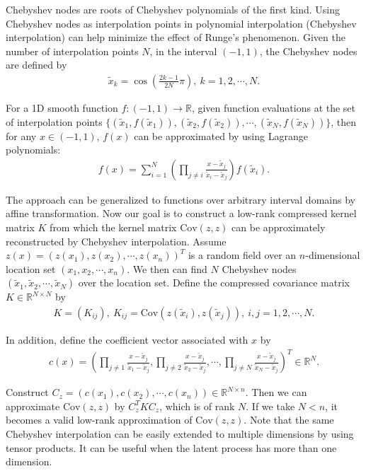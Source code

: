\documentclass[article,ij4uq]{ij4uq}              %
\begin{document}
\par Chebyshev nodes are roots of Chebyshev polynomials of the first kind. Using Chebyshev nodes as interpolation points in polynomial interpolation (Chebyshev interpolation) can help minimize the effect of Runge's phenomenon. Given the number of interpolation points $N$, in the interval $(-1,1)$, the Chebyshev nodes are defined by
\begin{align}
    \tilde{x}_{k}=\cos{\left(\frac{2k-1}{2N}\pi\right)},\ k=1,2,\cdots,N.\label{eq7}
\end{align}
\par For a 1D smooth function $f:(-1,1)\rightarrow \mathbb{R}$, given function evaluations at the set of interpolation points $\{(\tilde{x}_{1},f(\tilde{x}_{1})),(\tilde{x}_{2},f(\tilde{x}_{2})),\cdots,(\tilde{x}_{N},f(\tilde{x}_{N}))\}$, then for any $x\in(-1,1)$, $f(x)$ can be approximated by using Lagrange polynomials:
\begin{align}
    f(x)=\sum_{i=1}^{N}\left(\prod_{j\neq i}\frac{x-\tilde{x}_{j}}{\tilde{x}_{i}-\tilde{x}_{j}}\right)f(\tilde{x}_{i}).\label{eq8}
\end{align}
\par The approach can be generalized to functions over arbitrary interval domains by affine transformation. Now our goal is to construct a low-rank compressed kernel matrix $K$ from which the kernel matrix $\mathrm{Cov}(z,z)$ can be approximately reconstructed by Chebyshev interpolation.
Assume $z(x)=(z(x_{1}),z(x_{2}),\cdots,z(x_{n}))^{T}$ is a random field over an $n$-dimensional location set $(x_{1},x_{2},\cdots,x_{n})$. We then can find $N$ Chebyshev nodes $(\tilde{x}_{1},\tilde{x}_{2},\cdots,\tilde{x}_{N})$ over the location set. Define the compressed covariance matrix $K\in\mathbb{R}^{N\times N}$ by 
\begin{align}
    K=(K_{ij}),\ K_{ij}=\mathrm{Cov}(z(\tilde{x}_{i}),z(\tilde{x}_{j})),\ i,j=1,2,\cdots,N.\label{eq9}
\end{align}
\par In addition, define the coefficient vector associated with $x$ by
\begin{align}
    c(x)=\left(\prod_{j\neq 1}\frac{x-\tilde{x}_{j}}{\tilde{x}_{1}-\tilde{x}_{j}},\prod_{j\neq 2}\frac{x-\tilde{x}_{j}}{\tilde{x}_{2}-\tilde{x}_{j}},\cdots,\prod_{j\neq N}\frac{x-\tilde{x}_{j}}{\tilde{x}_{N}-\tilde{x}_{j}}\right)^{T}\in\mathbb{R}^{N}.\label{eq10}
\end{align}
\par Construct $C_{z}=(c(x_{1}),c(x_{2}),\cdots,c(x_{n}))\in\mathbb{R}^{N\times n}$. Then we can approximate $\mathrm{Cov}(z,z)$ by $C_{z}^{T}KC_{z}$, which is of rank $N$. If we take $N<n$, it becomes a valid low-rank approximation of $\mathrm{Cov}(z,z)$. Note that the same Chebyshev interpolation can be easily extended to multiple dimensions by using tensor products. It can be useful when the latent process has more than one dimension.
\end{document}
